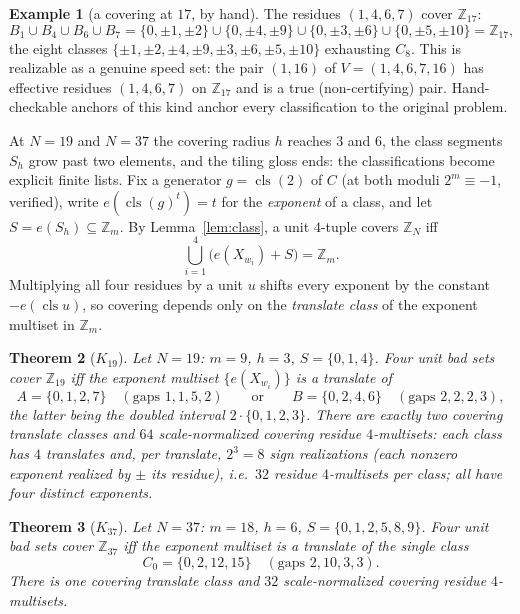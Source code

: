 \documentclass[11pt,a4paper]{article}
\numberwithin{equation}{section}
\theoremstyle{plain}
\theoremstyle{plain}
\newtheorem{theorem}{Theorem}[section]
\theoremstyle{definition}
\newtheorem{example}[theorem]{Example}
\theoremstyle{remark}
\newcommand{\Z}{\mathbb{Z}}
\DeclareMathOperator{\cls}{cls}
\begin{document}
\begin{example}[a covering at $17$, by hand]\label{ex:17}
The residues $(1,4,6,7)$ cover $\Z_{17}$:
\[
B_1\cup B_4\cup B_6\cup B_7
=\{0,\pm1,\pm2\}\cup\{0,\pm4,\pm9\}\cup\{0,\pm3,\pm6\}
 \cup\{0,\pm5,\pm10\}=\Z_{17},
\]
the eight classes $\{\pm1,\pm2,\pm4,\pm9,\pm3,\pm6,\pm5,\pm10\}$
exhausting $C_8$. This is realizable as a genuine speed set: the pair
$(1,16)$ of $V=(1,4,6,7,16)$ has effective residues $(1,4,6,7)$ on
$\Z_{17}$ and is a true (non-certifying) pair. Hand-checkable anchors of
this kind anchor every classification to the original problem.
\end{example}

At $N=19$ and $N=37$ the covering radius $h$ reaches $3$ and $6$, the
class segments $S_h$ grow past two elements, and the tiling gloss ends:
the classifications become explicit finite lists. Fix a generator
$g=\cls(2)$ of $C$ (at both moduli $2^{m}\equiv -1$, verified), write
$e(\cls(g)^t)=t$ for the \emph{exponent} of a class, and let
$S=e(S_h)\subseteq\Z_m$. By Lemma~\ref{lem:class}, a unit $4$-tuple
covers $\Z_N$ iff
\[
\bigcup_{i=1}^{4}\bigl(e(X_{w_i})+S\bigr)=\Z_m .
\]
Multiplying all four residues by a unit $u$ shifts every exponent by the
constant $-e(\cls u)$, so covering depends only on the \emph{translate
class} of the exponent multiset in $\Z_m$.

\begin{theorem}[$K_{19}$]\label{thm:K19}
Let $N=19$: $m=9$, $h=3$, $S=\{0,1,4\}$. Four unit bad sets cover
$\Z_{19}$ iff the exponent multiset $\{e(X_{w_i})\}$ is a translate of
\[
A=\{0,1,2,7\}\quad(\text{gaps }1,1,5,2)
\qquad\text{or}\qquad
B=\{0,2,4,6\}\quad(\text{gaps }2,2,2,3),
\]
the latter being the doubled interval $2\cdot\{0,1,2,3\}$. There are
exactly two covering translate classes and $64$ scale-normalized covering
residue $4$-multisets: each class has $4$ translates and, per translate,
$2^3=8$ sign realizations (each nonzero exponent realized by $\pm$ its
residue), i.e.\ $32$ residue $4$-multisets per class; all have four
distinct exponents.
\end{theorem}

\begin{theorem}[$K_{37}$]\label{thm:K37}
Let $N=37$: $m=18$, $h=6$, $S=\{0,1,2,5,8,9\}$. Four unit bad sets cover
$\Z_{37}$ iff the exponent multiset is a translate of the single class
\[
C_0=\{0,2,12,15\}\quad(\text{gaps }2,10,3,3).
\]
There is one covering translate class and $32$ scale-normalized covering
residue $4$-multisets.
\end{theorem}
\end{document}
